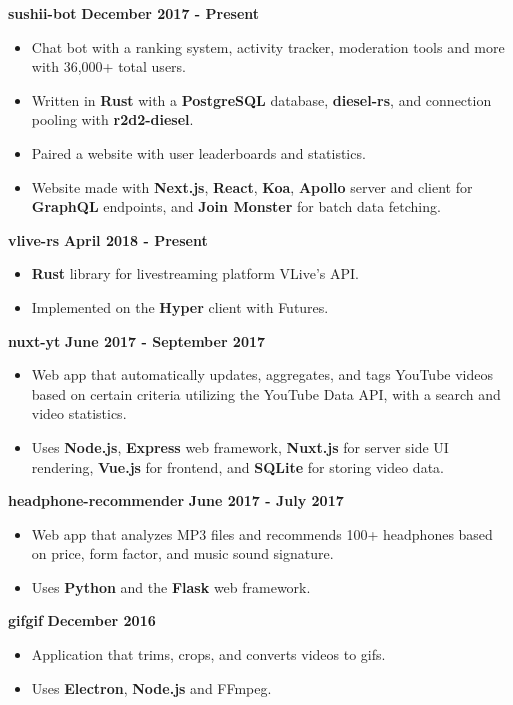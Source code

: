 \documentclass{res}
\begin{document}
\begin{resume}
		{\bf sushii-bot} \hfill {\bf December 2017 - Present} \\
			\vspace{-3.5mm}
			\begin{itemize} \itemsep -2pt
				\item Chat bot with a ranking system, activity tracker, moderation tools and more with 36,000+ total users.
				\item Written in {\bf Rust} with a {\bf PostgreSQL} database, {\bf diesel-rs}, and connection pooling with {\bf r2d2-diesel}.
				\item Paired a website with user leaderboards and statistics.
				\item Website made with {\bf Next.js}, {\bf React}, {\bf Koa}, {\bf Apollo} server and client for {\bf GraphQL} endpoints,
					and {\bf Join Monster} for batch data fetching.
			\end{itemize}
		
		{\bf vlive-rs} \hfill {\bf April 2018 - Present} \\
			\vspace{-3.5mm}
			\begin{itemize} \itemsep -2pt
				\item {\bf Rust} library for livestreaming platform VLive's API.
				\item Implemented on the {\bf Hyper} client with Futures.
			\end{itemize}

		{\bf nuxt-yt} \hfill {\bf June 2017 - September 2017} \\
			\vspace{-3.5mm}
			\begin{itemize} \itemsep -2pt
				\item Web app that automatically updates, aggregates, and tags YouTube videos based on certain criteria utilizing the YouTube Data API,
					with a search and video statistics.
				\item Uses {\bf Node.js}, {\bf Express} web framework, {\bf Nuxt.js} for server side 
					UI rendering, {\bf Vue.js} for frontend, and {\bf SQLite} for storing video data.
			\end{itemize}

		{\bf headphone-recommender} \hfill {\bf June 2017 - July 2017} \\
			\vspace{-3.5mm}
			\begin{itemize}	\itemsep -2pt
				\item Web app that analyzes MP3 files and recommends 100+ headphones based on price, form factor, and music sound signature.
				\item Uses {\bf Python} and the {\bf Flask} web framework.
			\end{itemize}
		
		{\bf gifgif} \hfill {\bf December 2016} \\
			\vspace{-3.5mm}
			\begin{itemize} \itemsep -2pt
				\item Application that trims, crops, and converts videos to gifs.
				\item Uses {\bf Electron}, {\bf Node.js} and FFmpeg.
			\end{itemize}
	\end{resume} 
\end{document}
